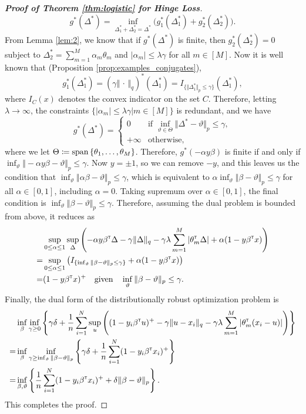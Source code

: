 \documentclass[12pt]{article}
\begin{document}
\begin{proof}[\textbf{Proof of Theorem \ref{thm:logistic} for Hinge Loss}]
\[    g^*(\Delta^*) = \inf_{\Delta^*_1+\Delta^*_2 = \Delta^*}\big(g_1^*(\Delta^*_1)+g^*_2(\Delta^*_2) \big).
    \]From Lemma \ref{lem:2}, we know that if $g^*(\Delta^*)$ is finite, then $g_2^*(\Delta_2^*) = 0$ subject to $\Delta_2^* = \sum_{m=1}^M\alpha_m\theta_m$ and $|\alpha_m|\leq \lambda\gamma$ for all $m\in[M]$. Now it is well known that (Proposition \ref{prop:examples_conjugates}), \[
    g_1^*(\Delta_1^*) = (\gamma\Vert \,\cdot\,\Vert_q)^*(\Delta_1^*) = I_{\{\Vert \Delta_1^*\Vert_p \leq \gamma\}}(\Delta_1^*),
    \]where $I_C(x)$ denotes the convex indicator on the set $C$. Therefore, letting $\lambda\to \infty$, the constraints $\{|\alpha_m|\leq \lambda\gamma |m\in[M]\}$ is redundant, and we have \[
    g^*(\Delta^*) = 
    \begin{cases}
        0 &\text{if }\inf_{\vartheta\in\Theta}\Vert \Delta^* -  \vartheta\Vert_p\leq \gamma,\\
        +\infty &\text{otherwise,}
    \end{cases}
    \]where we let $\Theta \coloneqq \operatorname{span}{\{\theta_1,\ldots,\theta_M\}}$. Therefore, $g^*(-\alpha y \beta)$ is finite if and only if $\inf_\vartheta \Vert -\alpha y \beta -\vartheta\Vert_p \leq \gamma$. Now $y =\pm 1$, so we can remove $-y$, and this leaves us the condition that $\inf_\vartheta \Vert \alpha \beta - \vartheta \Vert_p \leq \gamma$, which is equivalent to $\alpha \inf_\vartheta \Vert \beta - \vartheta\Vert_p\leq \gamma$ for all $\alpha \in [0,1]$, including $\alpha = 0$. Taking supremum over $\alpha \in [0,1]$, the final condition is $\inf_\vartheta \Vert \beta-\vartheta\Vert_p\leq \gamma$. Therefore, assuming the dual problem is bounded from above, it reduces as\begin{align*}
        &\sup_{0\leq \alpha\leq 1} \sup_{\Delta}\left( -\alpha y \beta^{\scriptscriptstyle \sf T}\Delta - \gamma\Vert\Delta\Vert_q - \gamma\lambda \sum_{m=1}^M|\theta_m^{\scriptscriptstyle \sf T} \Delta| +\alpha (1-y\beta^{\scriptscriptstyle \sf T} x)\right) \\
        =&\sup_{0\leq \alpha\leq 1}\left(I_{\{\inf_\vartheta \Vert \beta-\vartheta\Vert_p\leq \gamma\}} + \alpha(1-y\beta^{\scriptscriptstyle \sf T} x) \right)\\
        =&(1-y\beta^{\scriptscriptstyle \sf T} x)^+ \quad \text{given} \quad\inf_\vartheta \Vert \beta-\vartheta\Vert_p\leq \gamma.
    \end{align*}
    Finally, the dual form of the distributionally robust optimization problem is \begin{align*}
        &\inf_\beta\inf_{\gamma\geq 0}\left\{ \gamma\delta+ \dfrac{1}{n}\sum_{i=1}^N \sup_u \left( (1-y_i\beta^{\scriptscriptstyle \sf T} u)^+ - \gamma \Vert u-x_i \Vert_q - \gamma \lambda \sum_{m=1}^M |\theta_m^{\scriptscriptstyle \sf T} (x_i-u)|\right)\right\}\\
        =&\inf_\beta \inf_{\gamma\geq \inf_\vartheta \Vert \beta-\vartheta\Vert_p}\left\{\gamma\delta + \dfrac{1}{n}\sum_{i=1}^N (1-y_i\beta^{\scriptscriptstyle \sf T} x_i)^+ \right\}\\
        =&\inf_{\beta,\vartheta} \left\{\dfrac{1}{n}\sum_{i=1}^N (1-y_i\beta^{\scriptscriptstyle \sf T} x_i)^+ + \delta\Vert \beta-\vartheta\Vert_p\right\}.
    \end{align*}
    This completes the proof.
\end{proof}
\end{document}
